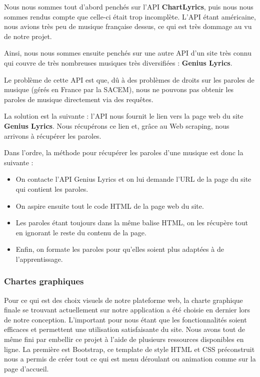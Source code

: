 \documentclass[12pt,french]{article}
\begin{document}
\medskip

Nous nous sommes tout d'abord penchés sur l'\gls{API} \textbf{ChartLyrics}, puis nous nous sommes rendus compte que celle-ci était trop incomplète. L'\gls{API} étant américaine, nous avions très peu de musique française dessus, ce qui est très dommage au vu de notre projet.

\medskip

Ainsi, nous nous sommes ensuite penchés sur une autre \gls{API} d'un site très connu qui couvre de très nombreuses musiques très diversifiées : \textbf{Genius Lyrics}.

Le problème de cette \gls{API} est que, dû à des problèmes de droits sur les paroles de musique (gérés en France par la \gls{SACEM}), nous ne pouvons pas obtenir les paroles de musique directement via des requêtes.

La solution est la suivante : l'\gls{API} nous fournit le lien vers la page web du site \textbf{Genius Lyrics}. Nous récupérons ce lien et, grâce au \gls{Web scraping}, nous arrivons à récupérer les paroles.

Dans l'ordre, la méthode pour récupérer les paroles d'une musique est donc la suivante :

\medskip

\begin{itemize}
	\item On contacte l'\gls{API} Genius Lyrics et on lui demande l'URL de la page du site qui contient les paroles.
	\item On aspire ensuite tout le code \gls{HTML} de la page web du site.
	\item Les paroles étant toujours dans la même balise \gls{HTML}, on les récupère tout en ignorant le reste du contenu de la page.
	\item Enfin, on formate les paroles pour qu'elles soient plus adaptées à de l'apprentissage.
\end{itemize}

\medskip

  \subsubsection{Chartes graphiques}

Pour ce qui est des choix visuels de notre plateforme web, la charte graphique finale se trouvant actuellement sur notre application a été choisie en dernier lors de notre conception. L'important pour nous étant que les fonctionnalités soient efficaces et permettent une utilisation satisfaisante du site. Nous avons tout de même fini par embellir ce projet à l'aide de plusieurs ressources disponibles en ligne. La première est Bootstrap, ce template de style \gls{HTML} et \gls{CSS} préconstruit nous a permis de créer tout ce qui est menu déroulant ou animation comme sur la page d'accueil.
\newline
\end{document}
